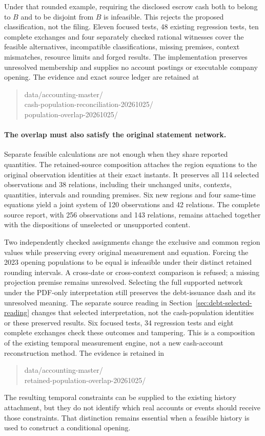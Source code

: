 Under that rounded example, requiring the disclosed escrow cash both to belong
to $B$ and to be disjoint from $B$ is infeasible. This rejects the proposed
classification, not the filing. Eleven focused tests, 48 existing regression
tests, ten complete exchanges and four separately checked rational witnesses
cover the feasible alternatives, incompatible classifications, missing premises,
context mismatches, resource limits and forged results. The implementation
preserves unresolved membership and supplies no account postings or executable
company opening. The evidence and exact source ledger are retained at
\begin{quote}\small\ttfamily
data/accounting-master/\\
cash-population-reconciliation-20261025/\\
population-overlap-20261025/
\end{quote}


\paragraph{The overlap must also satisfy the original statement network.}
Separate feasible calculations are not enough when they share reported
quantities. The retained-source composition attaches the region equations to
the original observation identities at their exact instants. It preserves all
114 selected observations and 38 relations, including their unchanged units,
contexts, quantities, intervals and rounding premises. Six new regions and four
same-time equations yield a joint system of 120 observations and 42 relations.
The complete source report, with 256 observations and 143 relations, remains
attached together with the dispositions of unselected or unsupported content.

Two independently checked assignments change the exclusive and common region
values while preserving every original measurement and equation. Forcing the
2023 opening populations to be equal is infeasible under their distinct
retained rounding intervals. A cross-date or cross-context comparison is
refused; a missing projection premise remains unresolved. Selecting the full
supported network under the PDF-only interpretation still preserves the
debt-issuance dash and its unresolved meaning. The separate source reading in
Section~\ref{sec:debt-selected-reading} changes that selected interpretation,
not the cash-population identities or these preserved results. Six focused tests, 34 regression tests and eight complete exchanges
check these outcomes and tampering. This is a composition of the existing
temporal measurement engine, not a new cash-account reconstruction method.
The evidence is retained in
\begin{quote}\small\ttfamily
data/accounting-master/\\
retained-population-overlap-20261025/
\end{quote}
The resulting temporal constraints can be supplied to the existing history
attachment, but they do not identify which real accounts or events should
receive those constraints. That distinction remains essential when a feasible
history is used to construct a conditional opening.


